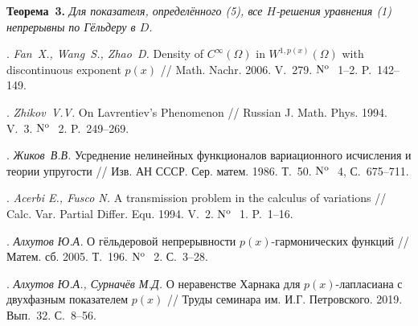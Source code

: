 
\textbf{Теорема~3.} {\it Для показателя, определённого (5), все $H$-решения уравнения (1) непрерывны по Гёльдеру в $D$.}

\bigskip




\litlist

. {\it Fan~X., Wang~S., Zhao~D.} Density of $C^\infty(\Omega)$ in $W^{1,p(x)}(\Omega)$ with discontinuous exponent $p(x)$ // Math. Nachr. 2006. V.~279. ${\rm N^o}$\,~1--2. P.~142--149.

.  {\it Zhikov~V.V.} On Lavrentiev's Phenomenon // Russian J. Math. Phys. 1994. V.~3.  ${\rm N^o}$\,~2. P.~249--269.


. {\it Жиков~В.В.} Усреднение нелинейных функционалов вариационного исчисления и теории упругости // Изв. АН СССР.
Сер. матем. 1986. Т.~50. ${\rm N^o}$\,~4, С.~675--711.

. {\it Acerbi E., Fusco N.} A transmission problem in the calculus of variations // Calc. Var. Partial Differ. Equ. 1994. V.~2.  ${\rm N^o}$\,~1. P.~1--16.

. {\it Алхутов Ю.А.} О гёльдеровой непрерывности $p(x)$-гар\-мо\-ни\-ческих функций // Матем. сб. 2005. Т.~196. ${\rm N^o}$\,~2. С.~3--28.

. {\it Алхутов Ю.А., Сурначёв М.Д.} О неравенстве Харнака для $p(x)$-лапласиана с двухфазным показателем $p(x)$ // Труды семинара им. И.Г. Петровского. 2019. Вып.~32. С.~8--56.
